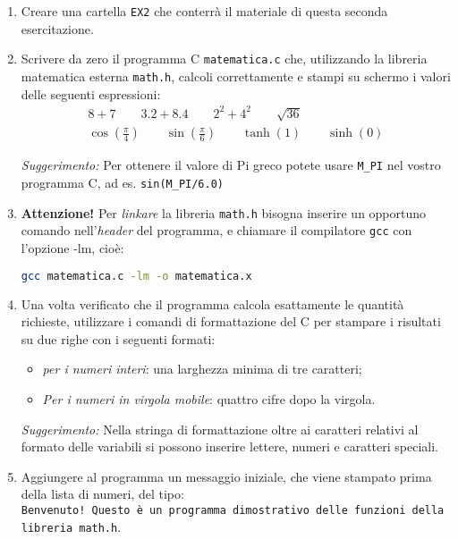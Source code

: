 \documentclass[11pt]{article}
\begin{document}
\begin{enumerate}
\item Creare una cartella  \texttt{EX2} che conterrà il materiale di questa seconda esercitazione.
\item Scrivere da zero il programma C \texttt{matematica.c} che, utilizzando la libreria matematica esterna \texttt{math.h}, calcoli correttamente e stampi su schermo i valori delle seguenti espressioni:
  \begin{eqnarray*}
    8+7 \qquad  3.2 + 8.4 \qquad 2^2+4^2 \qquad  \sqrt{36}
    \\
    \cos \left(\frac{\pi}{4}\right) \qquad \sin\left(\frac{\pi}{6}\right)
    \qquad
    \tanh\left(1\right) \qquad \sinh\left(0\right)
    \end{eqnarray*}

  {\em Suggerimento:\/} Per ottenere il valore di Pi greco potete usare \texttt{M\_PI} nel vostro programma
  C, ad es. \texttt{sin(M\_PI/6.0)}

\item {\bf Attenzione!} Per {\em linkare\/} la libreria \texttt{math.h} bisogna inserire un opportuno comando
nell'{\em header\/} del programma, e chiamare il compilatore \texttt{gcc} con l'opzione -lm, cio\`e:\\
\begin{lstlisting}[language=bash]
  gcc matematica.c -lm -o matematica.x
\end{lstlisting} 
\item Una volta verificato che il programma calcola esattamente le quantit\`a richieste, utilizzare i comandi di formattazione del C per stampare i risultati
  su due righe con i seguenti formati:
\begin{itemize}
  \item {\em per i numeri interi\/}: una larghezza minima di tre caratteri;
  \item {\em Per i numeri in virgola mobile\/}: quattro cifre dopo la virgola.
\end{itemize}
    {\em Suggerimento:\/} Nella stringa di formattazione oltre ai caratteri relativi al formato delle variabili si possono
    inserire lettere, numeri e caratteri speciali.
  \item Aggiungere al programma un messaggio iniziale, che viene stampato prima della lista di numeri, del tipo:\\
\texttt{Benvenuto! Questo \`e un programma dimostrativo delle funzioni della libreria math.h}.
\end{enumerate}
\end{document}
